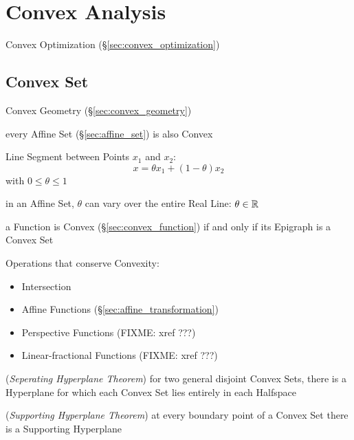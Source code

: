 \section{Convex Analysis}\label{sec:convex_analysis}

\fist Convex Optimization (\S\ref{sec:convex_optimization})



\subsection{Convex Set}\label{sec:convex_set}


\fist Convex Geometry (\S\ref{sec:convex_geometry})

every Affine Set (\S\ref{sec:affine_set}) is also Convex

Line Segment between Points $x_1$ and $x_2$:
\[
  x = \theta x_1 + (1-\theta) x_2
\]
with $0 \leq \theta \leq 1$

\fist in an Affine Set, $\theta$ can vary over the entire Real Line: $\theta
\in \mathbb{R}$

a Function is Convex (\S\ref{sec:convex_function}) if and only if its Epigraph
is a Convex Set

Operations that conserve Convexity:
\begin{itemize}
  \item Intersection
  \item Affine Functions (\S\ref{sec:affine_transformation})
  \item Perspective Functions (FIXME: xref ???)
  \item Linear-fractional Functions (FIXME: xref ???)
\end{itemize}

(\emph{Seperating Hyperplane Theorem}) for two general disjoint Convex Sets,
there is a Hyperplane for which each Convex Set lies entirely in each Halfspace

(\emph{Supporting Hyperplane Theorem}) at every boundary point of a Convex Set
there is a Supporting Hyperplane

